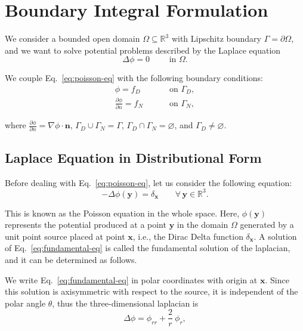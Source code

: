 
\section{Boundary Integral Formulation}
\label{sec:BoundaryIntegralFormulation}

We consider a bounded open domain $\Omega\subseteq\mathbb{R}^3$ with Lipschitz boundary $\Gamma=\partial\Omega$, and we want to solve potential problems described by the Laplace equation
\begin{equation}
\label{eq:poisson-eq}
\Delta \phi=0\qquad \text{ in }\Omega.
\end{equation}

We couple Eq.~\eqref{eq:poisson-eq} with the following boundary conditions:
\begin{subequations}
\label{eq:BCs}
\begin{align}
\label{eq:Dirichlet}
\phi=f_D &\qquad \text{ on }\Gamma_D, \\
\label{eq:Neumann} 
\frac{\partial\phi}{\partial n}=f_N &\qquad \text{ on }\Gamma_N, 
\end{align}
\end{subequations}

where $\frac{\partial \phi}{\partial n}=\nabla \phi\cdot \mathbf{n}$, $\Gamma_D\cup\Gamma_N=\Gamma$, $\Gamma_D\cap\Gamma_N=\varnothing$, and $\Gamma_D\neq\varnothing$.

\subsection{Laplace Equation in Distributional Form}
\label{sub:lapDistrib}%

Before dealing with Eq.~\eqref{eq:poisson-eq}, let us consider the following equation:
\begin{equation}
\label{eq:fundamental-eq}
-\Delta \phi(\mathbf{y})=\delta_\mathbf{x}\qquad\forall\,\mathbf{y}\in\mathbb{R}^3.
\end{equation}

This is known as the Poisson equation in the whole space. Here, $\phi(\mathbf{y})$ represents the potential produced at a point $\mathbf{y}$ in the domain $\Omega$ generated by a unit point source placed at point $\mathbf{x}$, i.e., the Dirac Delta function $\delta_\mathbf{x}$. A solution of Eq.~\eqref{eq:fundamental-eq} is called the fundamental solution of the laplacian, and it can be determined as follows.

We write Eq.~\eqref{eq:fundamental-eq} in polar coordinates with origin at $\mathbf{x}$. Since this solution is axisymmetric with respect to the source, it is independent of the polar angle $\theta$, thus the three-dimensional laplacian is
\begin{equation*}
\Delta \phi = \phi_{rr} + \frac{2}{r}\ \phi_r,
\end{equation*}

